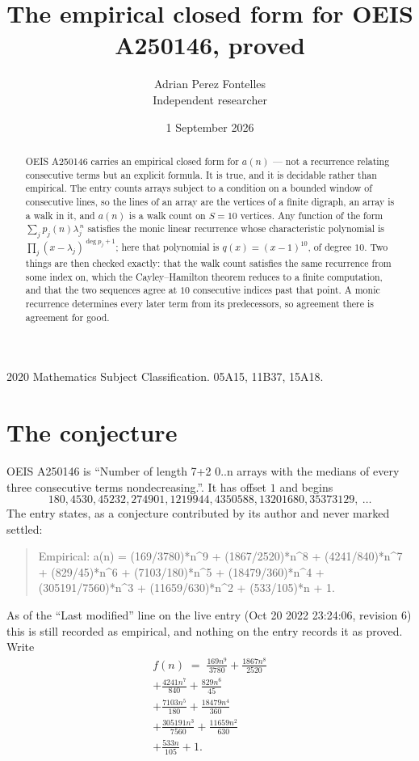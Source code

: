 \documentclass[11pt,a4paper]{article}
\title{The empirical closed form for OEIS A250146, proved}
\author{Adrian Perez Fontelles\\ \small Independent researcher}
\date{1 September 2026}
\theoremstyle{plain}
\theoremstyle{definition}
\begin{document}
\maketitle

\begin{abstract}
OEIS A250146 carries an empirical closed form for $a(n)$ --- not a recurrence relating
consecutive terms but an explicit formula. It is true, and it is decidable rather than
empirical. The entry counts arrays subject to a condition on a bounded window of consecutive lines, so the lines of an array are the
vertices of a finite digraph, an array is a walk in it, and $a(n)$ is a walk count on
$S=10$ vertices. Any function of the form $\sum_j p_j(n)\lambda_j^{\,n}$ satisfies the
monic linear recurrence whose characteristic polynomial is
$\prod_j(x-\lambda_j)^{\deg p_j+1}$; here that polynomial is $q(x)=(x-1)^{10}$, of degree
$10$. Two things are then checked exactly: that the walk count satisfies the same
recurrence from some index on, which the Cayley--Hamilton theorem reduces to a finite
computation, and that the two sequences agree at $10$ consecutive indices past that
point. A monic recurrence determines every later term from its predecessors, so agreement
there is agreement for good.
\end{abstract}

\noindent\small 2020 Mathematics Subject Classification. 05A15, 11B37, 15A18.\normalsize

\section{The conjecture}

OEIS A250146 is ``Number of length 7+2 0..n arrays with the medians of every three consecutive terms nondecreasing.''. It has offset $1$ and begins
\[
180, 4530, 45232, 274901, 1219944, 4350588, 13201680, 35373129,\ \dots
\]
The entry states, as a conjecture contributed by its author and never marked settled:
\begin{quote}
Empirical: a(n) = (169/3780)*n\^{}9 + (1867/2520)*n\^{}8 + (4241/840)*n\^{}7 + (829/45)*n\^{}6 + (7103/180)*n\^{}5 + (18479/360)*n\^{}4 + (305191/7560)*n\^{}3 + (11659/630)*n\^{}2 + (533/105)*n + 1.
\end{quote}
As of the ``Last modified'' line on the live entry (Oct 20 2022 23:24:06, revision 6) this is still
recorded as empirical, and nothing on the entry records it as proved. Write
\begin{multline*}
f(n)\;=\;\frac{169 n^{9}}{3780} + \frac{1867 n^{8}}{2520} \\
+ \frac{4241 n^{7}}{840} + \frac{829 n^{6}}{45} \\
+ \frac{7103 n^{5}}{180} + \frac{18479 n^{4}}{360} \\
+ \frac{305191 n^{3}}{7560} + \frac{11659 n^{2}}{630} \\
+ \frac{533 n}{105} + 1.
\end{multline*}
\end{document}
